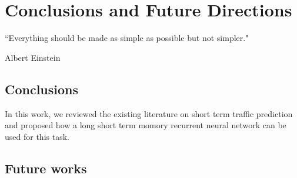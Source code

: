 
\chapter{Conclusions and Future Directions} %

\label{Chapter6} %


``Everything should be made as simple as possible but not simpler."

\begin{flushright}
Albert Einstein
\end{flushright}


\section{Conclusions}

In this work, we reviewed the existing literature on short term traffic prediction and proposed
how a long short term momory recurrent neural network can be used for this task.


\section{Future works}
